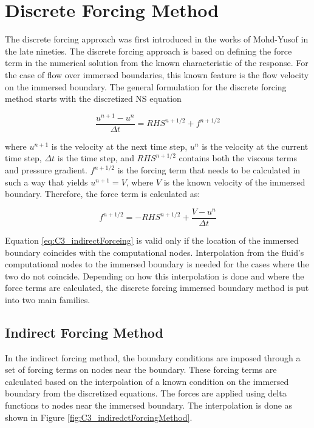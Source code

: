 \section{Discrete Forcing Method}
The discrete forcing approach was first introduced in the works of Mohd-Yusof \cite{mohd1997combined} in the late nineties. The discrete forcing approach is based on defining the force term in the numerical solution from the known characteristic of the response. For the case of flow over immersed boundaries, this known feature is the flow velocity on the immersed boundary. The general formulation for the discrete forcing method starts with the discretized NS equation

\begin{equation}\label{eq:C3_discreteNSforIndirectForcing}
    \frac{u^{n+1} - u^n}{\Delta t} = RHS^{n+1/2} + f^{n+1/2}
\end{equation}

where $u^{n+1}$ is the velocity at the next time step, $u^n$ is the velocity at the current time step, $\Delta t$ is the time step, and $RHS^{n+1/2}$ contains both the viscous terms and pressure gradient. $f^{n+1/2}$ is the forcing term that needs to be calculated in such a way that yields $u^{n+1} = V$, where $V$ is the known velocity of the immersed boundary. Therefore, the force term is calculated as:

\begin{equation}\label{eq:C3_indirectForceing}
    f^{n+1/2} = -RHS^{n+1/2} + \frac{V - u^n}{\Delta t}
\end{equation}

Equation \eqref{eq:C3_indirectForceing} is valid only if the location of the immersed boundary coincides with the computational nodes. Interpolation from the fluid's computational nodes to the immersed boundary is needed for the cases where the two do not coincide. Depending on how this interpolation is done and where the force terms are calculated, the discrete forcing immersed boundary method is put into two main families.

\subsection{Indirect Forcing Method}
In the indirect forcing method, the boundary conditions are imposed through a set of forcing terms on nodes near the boundary. These forcing terms are calculated based on the interpolation of a known condition on the immersed boundary from the discretized equations. The forces are applied using delta functions to nodes near the immersed boundary. The interpolation is done as shown in Figure \ref{fig:C3_indiredctForcingMethod}.

